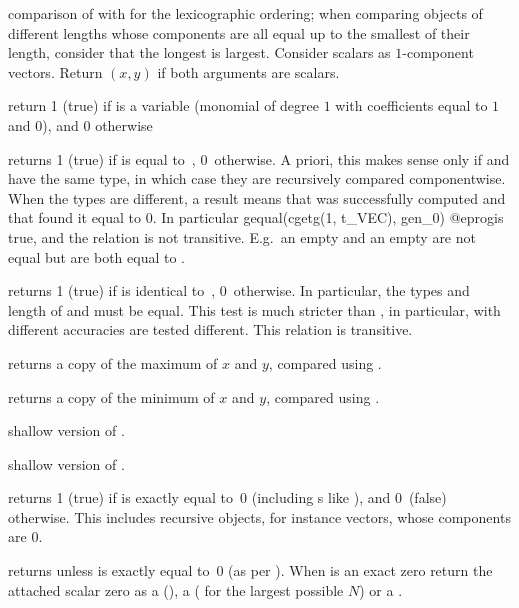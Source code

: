  comparison of  with  for the
lexicographic ordering; when comparing objects of different lengths whose
components are all equal up to the smallest of their length, consider that
the longest is largest. Consider scalars as $1$-component vectors. Return
$(x,y)$ if both arguments are scalars.

 return 1 (true) if  is a variable
(monomial of degree $1$ with  coefficients equal to $1$ and $0$),
and $0$ otherwise

 returns 1 (true) if  is equal
to~, 0~otherwise. A priori, this makes sense only if  and
 have the same type, in which case they are recursively compared
componentwise. When the types are different, a  result
means that  was successfully computed and that
 found it equal to $0$. In particular
\bprog
  gequal(cgetg(1, t_VEC), gen_0)
@eprog\noindent is true, and the relation is not transitive. E.g.~an empty
 and an empty  are not equal but are both equal to
.

 returns 1 (true) if  is identical
to~, 0~otherwise. In particular, the types and length of  and
 must be equal. This test is much stricter than , in
particular,  with different accuracies are tested different. This
relation is transitive.

 returns a copy of the maximum of $x$ and $y$,
compared using .

 returns a copy of the minimum of $x$ and $y$,
compared using .

 shallow version of .

 shallow version of .


 returns 1 (true) if  is exactly equal
to~0 (including s like ), and 0~(false) otherwise.
This includes recursive objects, for instance vectors, whose components are $0$.

 returns  unless  is exactly
equal to~0 (as per ). When  is an exact zero
return the attached scalar zero as a  (),
a  ( for the largest possible $N$) or a
.

